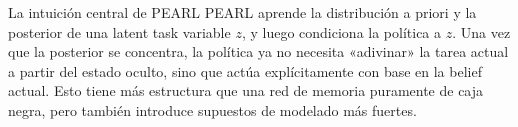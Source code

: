 \begin{importantbox}{La intuición central de PEARL}
PEARL aprende la distribución a priori y la posterior de una latent task variable $z$, y luego condiciona la política a $z$. Una vez que la posterior se concentra, la política ya no necesita «adivinar» la tarea actual a partir del estado oculto, sino que actúa explícitamente con base en la belief actual. Esto tiene más estructura que una red de memoria puramente de caja negra, pero también introduce supuestos de modelado más fuertes.
\end{importantbox}
